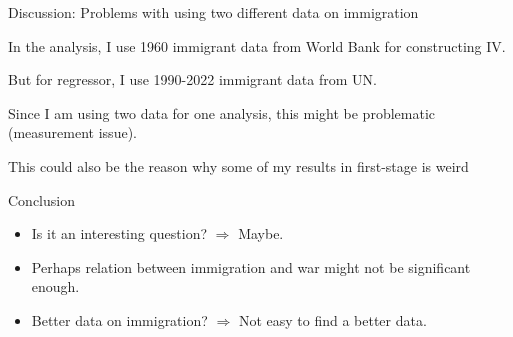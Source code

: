 \documentclass[notes,11pt, aspectratio=169]{beamer}
\newenvironment{wideitemize}{\itemize\addtolength{\itemsep}{10pt}}{\enditemize}
\begin{document}
\begin{frame}{Discussion: Problems with using two different data on immigration}
	\begin{wideitemize}
	\item In the analysis, I use 1960 immigrant data from World Bank for constructing IV.
	\item But for regressor, I use 1990-2022 immigrant data from UN. 
	\item Since I am using two data for one analysis, this might be problematic (measurement issue).
	\item This could also be the reason why some of my results in first-stage is weird
	\end{wideitemize}	
\end{frame}

\begin{frame}{Conclusion}
\begin{itemize}
	\item Is it an interesting question? $\Rightarrow$ Maybe.
	\item Perhaps relation between immigration and war might not be significant enough.
	\item Better data on immigration? $\Rightarrow$ Not easy to find a better data.
\end{itemize}	
\end{frame}
\end{document}
